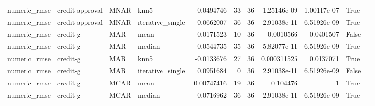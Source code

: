 \begin{table}[ht]
\begin{tabular}{llllrrrrrll}
 numeric\_rmse           & credit-approval      & MNAR        & knn5             &     -0.0494746   &                  33 &      36 & 1.25146e-09 & 1.00117e-07 & True               &                                                                                                                    \\
 numeric\_rmse           & credit-approval      & MNAR        & iterative\_single &     -0.0662007   &                  36 &      36 & 2.91038e-11 & 6.51926e-09 & True               &                                                                                                                    \\
 numeric\_rmse           & credit-g             & MAR         & mean             &      0.0171523   &                  10 &      36 & 0.0010566   & 0.0401507   & False              &                                                                                                                    \\
 numeric\_rmse           & credit-g             & MAR         & median           &     -0.0544735   &                  35 &      36 & 5.82077e-11 & 6.51926e-09 & True               &                                                                                                                    \\
 numeric\_rmse           & credit-g             & MAR         & knn5             &     -0.0133676   &                  27 &      36 & 0.000311525 & 0.0137071   & True               &                                                                                                                    \\
 numeric\_rmse           & credit-g             & MAR         & iterative\_single &      0.0951684   &                   0 &      36 & 2.91038e-11 & 6.51926e-09 & False              &                                                                                                                    \\
 numeric\_rmse           & credit-g             & MCAR        & mean             &     -0.00747416  &                  19 &      36 & 0.104476    & 1           & True               &                                                                                                                    \\
 numeric\_rmse           & credit-g             & MCAR        & median           &     -0.0716962   &                  36 &      36 & 2.91038e-11 & 6.51926e-09 & True               &                                                                                                                    \\

\end{tabular}
\end{table}
